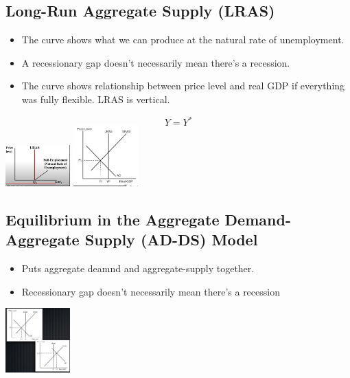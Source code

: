 \documentclass[8pt]{beamer}
\begin{document}
  \begin{frame}
	\section{Long-Run Aggregate Supply (LRAS)}
	\begin{itemize}
		\item The curve shows what we can produce at the natural rate of unemployment.
		\item A recessionary gap doesn't necessarily mean there's a recession.
		\item The curve shows relationship between price level and real GDP if
		everything was fully flexible. LRAS is vertical. 
	\end{itemize}
	$$Y = Y^*$$
	\includegraphics[width=2.5cm]{2021-10-12-12-18-10.png}
	\includegraphics[width=2.5cm]{2021-10-12-12-58-09.png}
  \end{frame}
  \begin{frame}
	\section{Equilibrium in the Aggregate Demand-Aggregate Supply (AD-DS) Model}
	\begin{itemize}
		\item Puts aggregate deamnd and aggregate-supply together.
		\item Recessionary gap doesn't necessarily mean there's a recession
	\end{itemize}
	\includegraphics[width=2.5cm]{2021-10-12-12-45-18.png}
  \end{frame}
\end{document}
